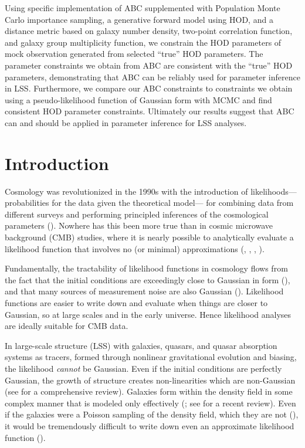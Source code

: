 Using specific implementation of ABC supplemented with Population Monte Carlo
importance sampling, a generative forward model using HOD, and a distance metric 
based on galaxy number density, two-point correlation function, and galaxy group
multiplicity function, we constrain the HOD parameters of mock observation 
generated from selected ``true'' HOD parameters. The parameter constraints we 
obtain from ABC are consistent with the ``true'' HOD parameters, demonstrating that ABC can be reliably  used for parameter inference in LSS. Furthermore, we compare our ABC constraints to constraints we obtain using a pseudo-likelihood function of Gaussian form with MCMC and find consistent HOD parameter constraints. Ultimately our results suggest that ABC can and should be applied in parameter  inference for LSS analyses. 


\section{Introduction}

Cosmology was revolutionized in the 1990s with the introduction of likelihoods---%
pro\-ba\-bil\-ities for the data given the theoretical model---%
for combining data from different surveys and performing principled inferences of
the cosmological parameters (\citealt{White:1996aa, Riess:1998aa}). 
Nowhere has this been more true than in cosmic microwave background (CMB) studies,
where it is nearly possible to analytically evaluate a likelihood function that
involves no (or minimal) approximations (\citealt{Oh:1999aa}, \citealt{Wandelt:2004aa},  
\citealt{Eriksen:2004aa}, \citealt{planckI, planckII}). 

Fundamentally, the tractability of likelihood functions in cosmology flows from
the fact that the initial conditions are exceedingly close to Gaussian in form 
(\citealt{planck_NG, planck_inflation}),
and that many sources of measurement noise are also Gaussian (\citealt{Knox:1995aa, Leach:2008aa}).
Likelihood functions are easier to write down and evaluate when things are closer 
to Gaussian, so at large scales and in the early universe. Hence likelihood analyses 
are ideally suitable for CMB data. 

In large-scale structure (LSS) with galaxies, quasars, and quasar absorption systems as tracers,
formed through nonlinear gravitational evolution and biasing, the likelihood {\em cannot} be Gaussian. 
Even if the initial conditions are perfectly Gaussian, the growth of structure creates non-linearities 
which are non-Gaussian (see \citealt{Bernardeau:2002aa} for a comprehensive review). 
Galaxies form within the density field in some complex manner that is modeled only effectively
(\citealt{Dressler:1980aa, Kaiser:1984aa, Santiago:1992aa, Steidel:1998aa}; see \citealt{somerville15} for a recent review).  
Even if the galaxies were a Poisson sampling of the density field, which they are not (\citealt{Mo:1996aa, Sommerville:2001aa, Casas-Miranda:2002aa}), it would be tremendously difficult to write down even 
an approximate likelihood function (\citealt{devpois}).

